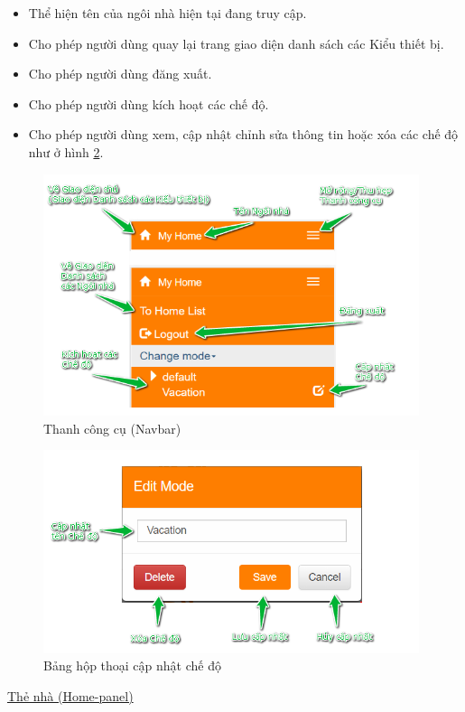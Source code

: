 \documentclass[12pt,a4paper,oneside]{extbook}
\begin{document}
\begin{itemize}[topsep=1mm,itemsep=-0.5mm]
\item Thể hiện tên của ngôi nhà hiện tại đang truy cập.
\item Cho phép người dùng quay lại trang giao diện danh sách các Kiểu thiết bị.
\item Cho phép người dùng đăng xuất.
\item Cho phép người dùng kích hoạt các chế độ.
\item Cho phép người dùng xem, cập nhật chỉnh sửa thông tin hoặc xóa các chế độ như ở hình \ref{fig:6-EditMode}.
\vspace{1mm}
\end{itemize}

\begin{figure}[h]
  \centering
     \includegraphics[width=11cm]{6-navbar}
  \caption{Thanh công cụ (Navbar)}\label{fig:6-navbar}
\end{figure}

\begin{figure}[h!]
  \centering
     \includegraphics[width=11cm]{6-EditMode}
  \caption{Bảng hộp thoại cập nhật chế độ}\label{fig:6-EditMode}
\end{figure}

\underline{Thẻ nhà (Home-panel)}
\end{document}
